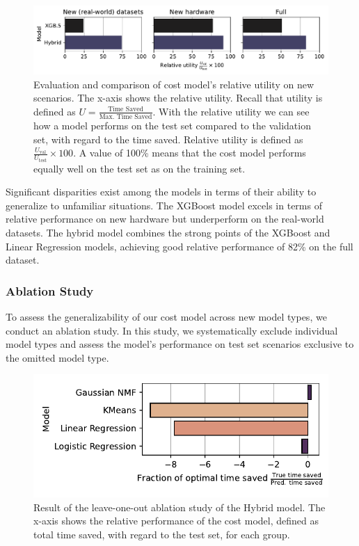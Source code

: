 \begin{figure}
    \centering
    \includegraphics[width=\linewidth]{chapters/06_evaluation/figures/eval_generalization.pdf}
    \caption[Evaluation of utility on new scenarios]{Evaluation and comparison of cost model's relative utility on new scenarios. The x-axis shows the relative utility. Recall that utility is defined as $U=\frac{\text{Time Saved}}{\text{Max. Time Saved}}$. With the relative utility we can see how a model performs on the test set compared to the validation set, with regard to the time saved. Relative utility is defined as $\frac{U_{\text{val}}}{U_{\text{test}}} \times 100$. A value of 100\% means that the cost model performs equally well on the test set as on the training set.}
    \label{fig:6-generalization}
\end{figure}

Significant disparities exist among the models in terms of their ability to generalize to unfamiliar situations. The XGBoost model excels in terms of relative performance on new hardware but underperform on the real-world datasets. The hybrid model combines the strong points of the XGBoost and Linear Regression models, achieving good relative performance of 82\% on the full dataset.

\subsubsection{Ablation Study}
\label{subsubsec:6-ablation}
To assess the generalizability of our cost model across new model types, we conduct an ablation study. In this study, we systematically exclude individual model types and assess the model’s performance on test set scenarios exclusive to the omitted model type.

\begin{figure}[ht]
    \centering
    \includegraphics[width=0.6\linewidth]{chapters/06_evaluation/figures/hybrid-ablation.pdf}
    \caption[Results of the ablation study]{Result of the leave-one-out ablation study of the Hybrid model. The x-axis shows the relative performance of the cost model, defined as total time saved, with regard to the test set, for each group.}
    \label{fig:6-ablation}
\end{figure}


